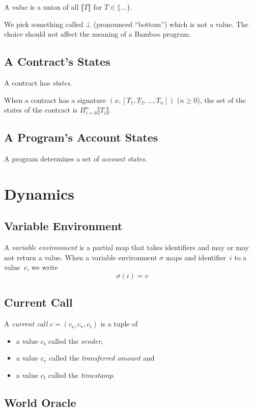 \documentclass{book}
\newcommand{\sem}[1]{\llbracket{#1}\rrbracket}
\begin{document}
A \textit{value} is a union of all $\sem{T}$ for $T \in \{\ldots\}$.

We pick something called $\bot$ (pronounced ``bottom'') which is not a value.  The choice should not affect the meaning of a Bamboo program.

\subsection{A Contract's States}
A contract has \textit{states}.

When a contract has a signature $(x, [T_1, T_2, \ldots, T_n])$ ($n \ge 0$),
the set of the states of the contract is
$\Pi_{i = 0}^{n} \sem{T_i}$.

\subsection{A Program's Account States}
A program determines a set of \textit{account states}.

\section{Dynamics}

\subsection{Variable Environment}

A \textit{variable environment} is a partial map that takes identifiers and may or may not return a value.  When a variable environment $\sigma$ maps and identifier~$i$ to a value~$v$, we write
\[
\sigma(i) = v
\]

\subsection{Current Call}

A \textit{current call} $c = (c_\mathrm{s}, c_\mathrm{v}, c_\mathrm{t})$ is a tuple of
\begin{itemize}
\item a value $c_\mathrm{s}$ called the \textit{sender},
\item a value $c_\mathrm{v}$ called the \textit{transferred amount} and
\item a value $c_\mathrm{t}$ called the \textit{timestamp}.
\end{itemize}

\subsection{World Oracle}
\end{document}
